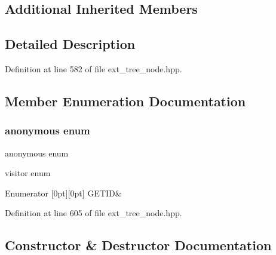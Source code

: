 \subsection*{Additional Inherited Members}


\subsection{Detailed Description}


Definition at line 582 of file ext\+\_\+tree\+\_\+node.\+hpp.



\subsection{Member Enumeration Documentation}
\mbox{\label{structomp__for__pragma_ad3ae285036548079be8e4ce4a1059f3f}} 
\subsubsection{\texorpdfstring{anonymous enum}{anonymous enum}}
{\footnotesize\ttfamily anonymous enum}



visitor enum 

\begin{DoxyEnumFields}{Enumerator}
[0pt][0pt]{}\mbox{\label{structomp__for__pragma_ad3ae285036548079be8e4ce4a1059f3fa4a57d7f0d1c00a1e3ddd7ec646da5fa7}} 
G\+E\+T\+ID&\\
\hline

\end{DoxyEnumFields}


Definition at line 605 of file ext\+\_\+tree\+\_\+node.\+hpp.



\subsection{Constructor \& Destructor Documentation}
\mbox{\label{structomp__for__pragma_a396079945010b64872e201cd5c42c41b}} 
